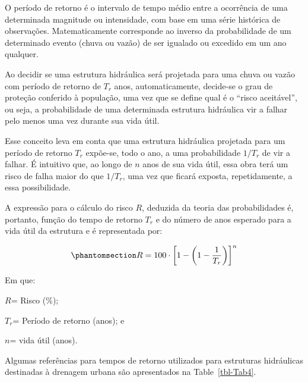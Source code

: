 \documentclass[
]{agujournal2019}
\begin{document}
O período de retorno é o intervalo de tempo médio entre a ocorrência de
uma determinada magnitude ou intensidade, com base em uma série
histórica de observações. Matematicamente corresponde ao inverso da
probabilidade de um determinado evento (chuva ou vazão) de ser igualado
ou excedido em um ano qualquer.

Ao decidir se uma estrutura hidráulica será projetada para uma chuva ou
vazão com período de retorno de \(T_{r}\) anos, automaticamente,
decide-se o grau de proteção conferido à população, uma vez que se
define qual é o ``risco aceitável'', ou seja, a probabilidade de uma
determinada estrutura hidráulica vir a falhar pelo menos uma vez durante
sua vida útil.

Esse conceito leva em conta que uma estrutura hidráulica projetada para
um período de retorno \(T_{r}\) expõe-se, todo o ano, a uma
probabilidade \(1/T_{r}\) de vir a falhar. É intuitivo que, ao longo de
\(n\) anos de sua vida útil, essa obra terá um risco de falha maior do
que \(1/T_{r}\), uma vez que ficará exposta, repetidamente, a essa
possibilidade.

A expressão para o cálculo do risco \(R\), deduzida da teoria das
probabilidades é, portanto, função do tempo de retorno \(T_{r}\) e do
número de anos esperado para a vida útil da estrutura e é representada
por:

\begin{equation}\phantomsection\label{eq-Eq2}{
R=100\cdot\bigg[1- \bigg(1-\frac{1}{T_r}\bigg)\bigg]^{n}
}\end{equation}

Em que:

\(R\)= Risco (\%);

\(T_{r}\)= Período de retorno (anos); e

\(n\)= vida útil (anos).

Algumas referências para tempos de retorno utilizados para estruturas
hidráulicas destinadas à drenagem urbana são apresentados na
Table~\ref{tbl-Tab4}.
\end{document}
